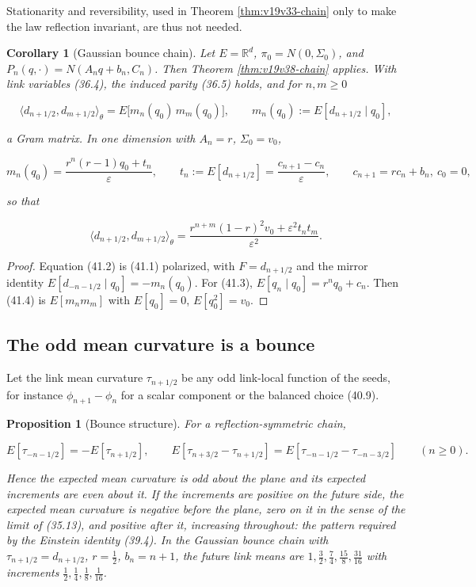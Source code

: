 \documentclass[11pt]{article}
\newtheorem{proposition}[theorem]{Proposition}
\newtheorem{corollary}[theorem]{Corollary}
\theoremstyle{remark}
\begin{document}
Stationarity and reversibility, used in Theorem \ref{thm:v19v33-chain}
only to make the law reflection invariant, are thus not needed.

\begin{corollary}[Gaussian bounce chain]
\label{cor:v19v38-gaussian}
Let \(E=\mathbb R^d\), \(\pi_0=N(0,\Sigma_0)\), and
\(P_n(q,\cdot)=N(A_nq+b_n,C_n)\).  Then Theorem
\ref{thm:v19v38-chain} applies.  With link variables (36.4), the
induced parity (36.5) holds, and for \(n,m\geq0\)

\[
 \langle d_{n+1/2},d_{m+1/2}\rangle_\theta
 =E\bigl[m_n(q_0)\,m_m(q_0)\bigr],
 \qquad m_n(q_0):=E[d_{n+1/2}\mid q_0],                              \tag{41.2}
\]

a Gram matrix.  In one dimension with \(A_n=r\), \(\Sigma_0=v_0\),

\[
 m_n(q_0)=\frac{r^n(r-1)q_0+t_n}{\varepsilon},\qquad
 t_n:=E[d_{n+1/2}]=\frac{c_{n+1}-c_n}{\varepsilon},\qquad
 c_{n+1}=rc_n+b_n,\ c_0=0,                                          \tag{41.3}
\]

so that

\[
 \langle d_{n+1/2},d_{m+1/2}\rangle_\theta
 =\frac{r^{n+m}(1-r)^2v_0+\varepsilon^2t_nt_m}{\varepsilon^2}.        \tag{41.4}
\]
\end{corollary}

\begin{proof}
Equation (41.2) is (41.1) polarized, with \(F=d_{n+1/2}\) and the mirror
identity \(E[d_{-n-1/2}\mid q_0]=-m_n(q_0)\).  For (41.3),
\(E[q_n\mid q_0]=r^nq_0+c_n\).  Then (41.4) is
\(E[m_nm_m]\) with \(E[q_0]=0\), \(E[q_0^2]=v_0\).
\end{proof}

\subsection{The odd mean curvature is a bounce}

Let the link mean curvature \(\tau_{n+1/2}\) be any odd link-local
function of the seeds, for instance \(\phi_{n+1}-\phi_n\) for a scalar
component or the balanced choice (40.9).

\begin{proposition}[Bounce structure]
\label{prop:v19v38-bounce}
For a reflection-symmetric chain,

\[
 E[\tau_{-n-1/2}]=-E[\tau_{n+1/2}],
 \qquad
 E[\tau_{n+3/2}-\tau_{n+1/2}]=E[\tau_{-n-1/2}-\tau_{-n-3/2}]
 \qquad(n\geq0).                                                    \tag{41.5}
\]

Hence the expected mean curvature is odd about the plane and its
expected increments are even about it.  If the increments are positive
on the future side, the expected mean curvature is negative before the
plane, zero on it in the sense of the limit of (35.13), and positive
after it, increasing throughout: the pattern required by the Einstein
identity (39.4).  In the Gaussian bounce chain with
\(\tau_{n+1/2}=d_{n+1/2}\), \(r=\tfrac12\), \(b_n=n+1\), the future link
means are \(1,\tfrac32,\tfrac74,\tfrac{15}8,\tfrac{31}{16}\) with
increments \(\tfrac12,\tfrac14,\tfrac18,\tfrac1{16}\).
\end{proposition}
\end{document}
